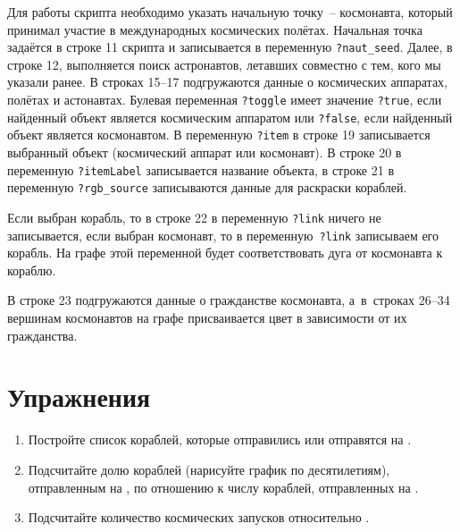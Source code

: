 Для работы скрипта необходимо указать начальную точку~-- космонавта, 
который принимал участие в международных космических полётах. 
Начальная точка задаётся в строке 11 скрипта и записывается в переменную \lstinline|?naut_seed|. 
Далее, в строке 12, выполняется поиск астронавтов, 
летавших совместно с тем, кого мы указали ранее. 
В строках 15--17 подгружаются данные о космических аппаратах, полётах и астонавтах. 
Булевая переменная \lstinline|?toggle| имеет значение \lstinline|?true|, 
если найденный объект является космическим аппаратом или  \lstinline|?false|, 
если найденный объект является космонавтом. 
В переменную \lstinline|?item| в строке 19 записывается выбранный объект (космический аппарат или космонавт). 
В строке 20 в переменную \lstinline|?itemLabel| записывается название объекта, 
в строке 21 в переменную \lstinline|?rgb_source| записываются данные для раскраски кораблей. 

Если выбран корабль, то в строке 22 в переменную \lstinline|?link| ничего не записывается, 
если выбран космонавт, то в переменную~\lstinline|?link| записываем его корабль. 
На графе этой переменной будет соответствовать дуга от космонавта к кораблю. 

В строке 23 подгружаются данные о гражданстве космонавта, 
а~в~строках 26--34 вершинам космонавтов на графе присваивается цвет в зависимости от их гражданства. 



\section{Упражнения}
\begin{enumerate}
  \item Постройте список кораблей, которые отправились или отправятся на .
  \item Подсчитайте долю кораблей (нарисуйте график по десятилетиям), 
        отправленным на , 
        по отношению к числу кораблей, отправленных на .
  \item Подсчитайте количество  космических запусков 
      относительно .%
\end{enumerate}



